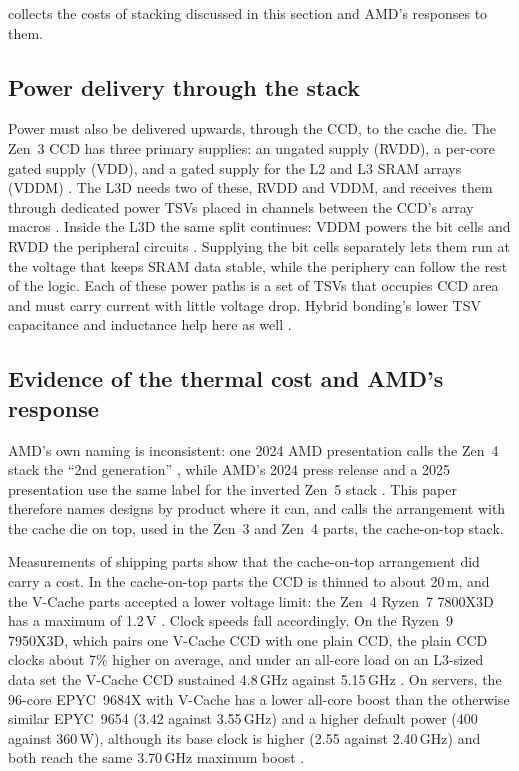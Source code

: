  collects the costs of stacking discussed in this section and AMD's responses to them.



\subsection{Power delivery through the stack}
Power must also be delivered upwards, through the CCD, to the cache die. The Zen~3 CCD has three primary supplies: an ungated supply (RVDD), a per-core gated supply (VDD), and a gated supply for the L2 and L3 SRAM arrays (VDDM) \cite[slide~23]{wuu2022vcache}. The L3D needs two of these, RVDD and VDDM, and receives them through dedicated power TSVs placed in channels between the CCD's array macros \cite[slide~24]{wuu2022vcache}. Inside the L3D the same split continues: VDDM powers the bit cells and RVDD the peripheral circuits \cite[slide~25]{wuu2022vcache}. Supplying the bit cells separately lets them run at the voltage that keeps SRAM data stable, while the periphery can follow the rest of the logic. Each of these power paths is a set of TSVs that occupies CCD area and must carry current with little voltage drop. Hybrid bonding's lower TSV capacitance and inductance help here as well \cite{swaminathanAdvancedPackagingEnabling2021}.

\subsection{Evidence of the thermal cost and AMD's response}
\label{sec:thermal-evidence}
AMD's own naming is inconsistent: one 2024 AMD presentation calls the Zen~4 stack the ``2nd generation'' \cite{alam2ndGeneration3D2024}, while AMD's 2024 press release and a 2025 presentation use the same label for the inverted Zen~5 stack \cite{advancedmicrodevicesinc.GamingLegendContinues2024,lambertHeterogenousIntegrationHigh2025}. This paper therefore names designs by product where it can, and calls the arrangement with the cache die on top, used in the Zen~3 and Zen~4 parts, the cache-on-top stack.

Measurements of shipping parts show that the cache-on-top arrangement did carry a cost. In the cache-on-top parts the CCD is thinned to about 20\,\textmu m, and the V-Cache parts accepted a lower voltage limit: the Zen~4 Ryzen~7 7800X3D has a maximum of 1.2\,V \cite{cozmaAMDs9800X3D2nd2024}. Clock speeds fall accordingly. On the Ryzen~9 7950X3D, which pairs one V-Cache CCD with one plain CCD, the plain CCD clocks about 7\% higher on average, and under an all-core load on an L3-sized data set the V-Cache CCD sustained 4.8\,GHz against 5.15\,GHz \cite{lamAMDs7950X3DZen2023}. On servers, the 96-core EPYC~9684X with V-Cache has a lower all-core boost than the otherwise similar EPYC~9654 (3.42 against 3.55\,GHz) and a higher default power (400 against 360\,W), although its base clock is higher (2.55 against 2.40\,GHz) and both reach the same 3.70\,GHz maximum boost \cite{advancedmicrodevicesinc.AMDEPYC90042023}.

